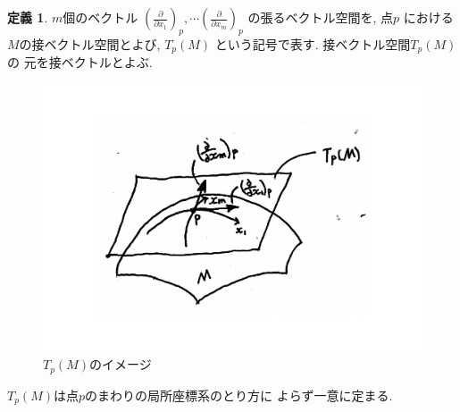\documentclass[twocolumn]{jarticle}
\theoremstyle{definition}
\newtheorem{definition}[theorem]{定義}
\begin{document}
\begin{definition}\label{def:tangent vector space}
  $m$個のベクトル
  $\left(\frac{\partial}{\partial x_1}\right)_p, 
  \cdots 
  \left(\frac{\partial}{\partial x_m}\right)_p$
  の張るベクトル空間を, 点$p$
  における$M$の接ベクトル空間とよび, 
  $T_p(M)$
  という記号で表す. 接ベクトル空間$T_p(M)$の
  元を接ベクトルとよぶ. 
\end{definition}
\begin{figure}[H]
      \centering
      \includegraphics[keepaspectratio, scale=0.28]{tangentVectorSpace_2.pdf}
      \caption{$T_p(M)$のイメージ}
      \label{}
\end{figure}
$T_p(M)$は点$p$のまわりの局所座標系のとり方に
よらず一意に定まる. 
\end{document}
